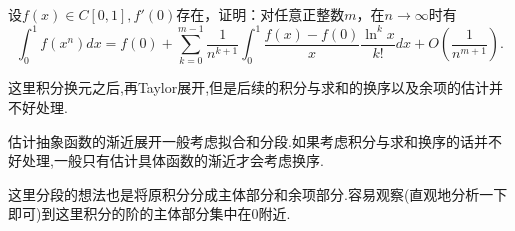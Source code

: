 \documentclass[../../main.tex]{subfiles}
\begin{document}
\begin{example}
设\(f(x)\in C[0,1],f'(0)\)存在，证明：对任意正整数\(m\)，在\(n\rightarrow\infty\)时有
\[
\int_{0}^{1}f(x^{n})dx = f(0)+\sum_{k = 0}^{m - 1}\frac{1}{n^{k + 1}}\int_{0}^{1}\frac{f(x)-f(0)}{x}\frac{\ln^{k}x}{k!}dx + O\left(\frac{1}{n^{m+1}}\right).
\]
\end{example}
\begin{remark}
这里积分换元之后,再Taylor展开,但是后续的积分与求和的换序以及余项的估计并不好处理.
\end{remark}
\begin{note}
估计抽象函数的渐近展开一般考虑拟合和分段.如果考虑积分与求和换序的话并不好处理,一般只有估计具体函数的渐近才会考虑换序.

这里分段的想法也是将原积分分成主体部分和余项部分.容易观察(直观地分析一下即可)到这里积分的阶的主体部分集中在0附近.
\end{note}
\end{document}
